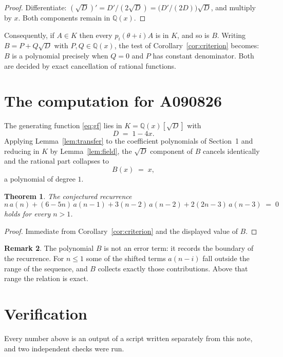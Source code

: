 \documentclass[11pt,a4paper]{article}
\theoremstyle{plain}
\newtheorem{theorem}{Theorem}
\theoremstyle{definition}
\newtheorem{remark}[theorem]{Remark}
\begin{document}
\begin{proof}
Differentiate: $(\sqrt{D})'=D'/(2\sqrt{D})=\bigl(D'/(2D)\bigr)\sqrt{D}$, and multiply by
$x$. Both components remain in $\mathbb{Q}(x)$.
\end{proof}

Consequently, if $A\in K$ then every $p_{i}(\theta+i)A$ is in $K$, and so is $B$. Writing
$B=P+Q\sqrt{D}$ with $P,Q\in\mathbb{Q}(x)$, the test of Corollary~\ref{cor:criterion}
becomes: $B$ is a polynomial precisely when $Q=0$ and $P$ has constant denominator. Both
are decided by exact cancellation of rational functions.

\section{The computation for A090826}

The generating function \eqref{eq:gf} lies in $K=\mathbb{Q}(x)[\sqrt{D}]$ with
\[
D \;=\; 1 - 4 x .
\]
Applying Lemma~\ref{lem:transfer} to the coefficient polynomials of Section~1 and reducing
in $K$ by Lemma~\ref{lem:field}, the $\sqrt{D}$ component of $B$ cancels identically and
the rational part collapses to
\[
B(x)\;=\;x ,
\]
a polynomial of degree $1$.

\begin{theorem}
The conjectured recurrence
\[
n\,a(n) + (6 - 5 n)\,a(n-1) + 3 \left(n - 2\right)\,a(n-2) + 2 \left(2 n - 3\right)\,a(n-3) \;=\;0
\]
holds for every $n>1$.
\end{theorem}

\begin{proof}
Immediate from Corollary~\ref{cor:criterion} and the displayed value of $B$.
\end{proof}

\begin{remark}
The polynomial $B$ is not an error term: it records the boundary of the recurrence. For
$n\le1$ some of the shifted terms $a(n-i)$ fall outside the range of the sequence,
and $B$ collects exactly those contributions. Above that range the relation is exact.
\end{remark}

\section{Verification}

Every number above is an output of a script written separately from this note, and two
independent checks were run.
\end{document}
